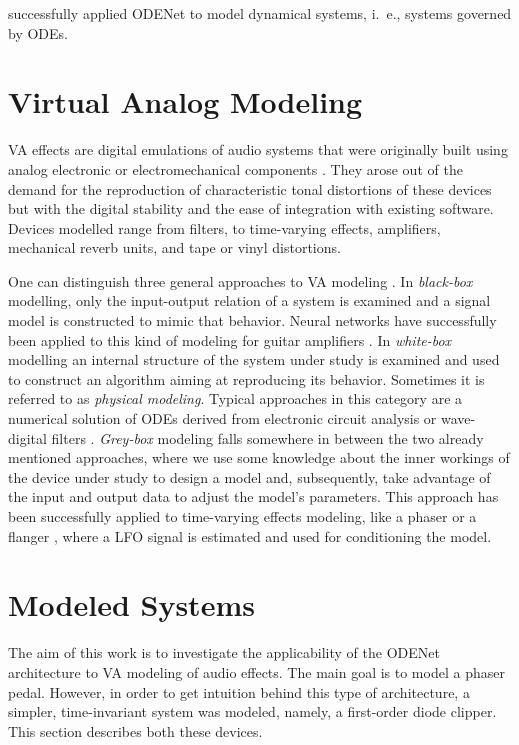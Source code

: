 \cite{Karlsson2019} successfully applied ODENet to model dynamical systems, i.\ e., systems governed by \acp{ODE}. 

\section{Virtual Analog Modeling}
\label{sec:virtual_analog_modeling}
\Ac{VA} effects are digital emulations of audio systems that were originally built using analog electronic or electromechanical components \cite{Zoelzer2011}. They arose out of the demand for the reproduction of characteristic tonal distortions of these devices but with the digital stability and the ease of integration with existing software. Devices modelled range from filters, to time-varying effects, amplifiers, mechanical reverb units, and tape or vinyl distortions.

One can distinguish three general approaches to \ac{VA} modeling \cite{Kiiski2016,Wright2020}. In \emph{black-box} modelling, only the input-output relation of a system is examined and a signal model is constructed to mimic that behavior. Neural networks have successfully been applied to this kind of modeling for guitar amplifiers \cite{Wright2019,Wrightetal2020}. In \emph{white-box} modelling an internal structure of the system under study is examined and used to construct an algorithm aiming at reproducing its behavior. Sometimes it is referred to as \emph{physical modeling}. Typical approaches in this category are a numerical solution of \acp{ODE} derived from electronic circuit analysis \cite{Yeh2007,Eichas2014} or wave-digital filters \cite{PASPWEB2010}. \emph{Grey-box} modeling falls somewhere in between the two already mentioned approaches, where we use some knowledge about the inner workings of the device under study to design a model and, subsequently, take advantage of the input and output data to adjust the model's parameters. This approach has been successfully applied to time-varying effects modeling, like a phaser or a flanger \cite{Kiiski2016,Wright2020}, where a \ac{LFO} signal is estimated and used for conditioning the model.


\section{Modeled Systems}
\label{sec:modeled_systems}
The aim of this work is to investigate the applicability of the ODENet architecture to \ac{VA} modeling of audio effects. The main goal is to model a phaser pedal. However, in order to get intuition behind this type of architecture, a simpler, time-invariant system was modeled, namely, a first-order diode clipper. This section describes both these devices.

